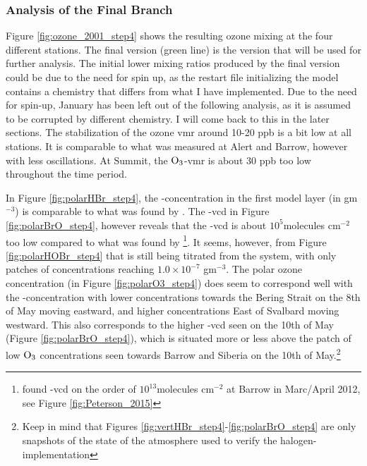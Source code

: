 \subsubsection{Analysis of the Final Branch}\label{sec:disc_finalBRanch}


Figure \ref{fig:ozone_2001_step4} shows the resulting ozone mixing at the four different stations. The final version (green line) is the version that will be used for further analysis. The initial lower mixing ratios produced by the final version could be due to the need for spin up, as the restart file initializing the model contains a chemistry that differs from what I have implemented. Due to the need for spin-up, January has been left out of the following analysis, as it is assumed to be corrupted by different chemistry. I will come back to this in the later sections. The stabilization of the ozone \acrshort{vmr} around 10-20 ppb is a bit low at all stations. It is comparable to what was measured at Alert and Barrow, however with less oscillations. At Summit, the $\mathrm{O_3}$-\acrshort{vmr} is about 30 ppb too low throughout the time period.


\medskip

In Figure \ref{fig:polarHBr_step4}, the -concentration in the first model layer (in gm$^{-3}$) is comparable to what was found by \cite{barrie}. The -\acrshort{vcd} in Figure \ref{fig:polarBrO_step4}, however reveals that the -\acrshort{vcd} is about $10^5$molecules cm$^{-2}$ too low compared to what was found by \cite{Peterson2015}\footnote{\cite{Peterson2015} found -\acrshort{vcd} on the order of $10^13$molecules cm$^{-2}$ at Barrow in Marc/April 2012, see Figure \ref{fig:Peterson_2015}}. It seems, however, from Figure \ref{fig:polarHOBr_step4} that  is still being titrated from the system, with only patches of concentrations reaching $1.0\times10^{-7}$ gm$^{-3}$. The polar ozone concentration (in Figure \ref{fig:polarO3_step4}) does seem to correspond well with the -concentration with lower concentrations towards the Bering Strait on the 8th of May moving eastward, and higher concentrations East of Svalbard moving westward. This also corresponds to the higher -vcd seen on the 10th of May (Figure \ref{fig:polarBrO_step4}), which is situated more or less above the patch of low $\mathrm{O_3}$ concentrations seen towards Barrow and Siberia on the 10th of May.\footnote{Keep in mind that Figures \ref{fig:vertHBr_step4}-\ref{fig:polarBrO_step4} are only snapshots of the state of the atmosphere used to verify the halogen-implementation} 

